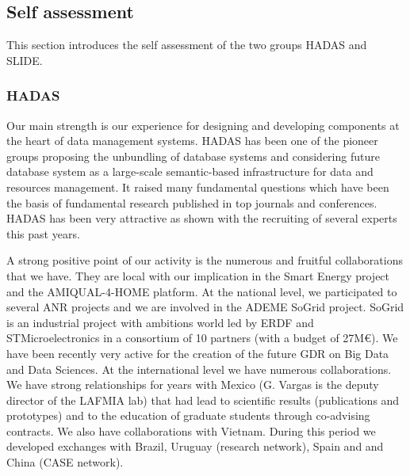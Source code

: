 

\subsection{Self assessment} %
\label{sub:hadas_self_assesment}

This section introduces the self assessment of the two groups HADAS and SLIDE.

\subsubsection*{HADAS}

Our main strength is our experience for designing and developing components at the heart of data management systems. HADAS has been one of the pioneer groups proposing the unbundling of database systems and considering future database system as a large-scale semantic-based infrastructure for data and resources management. It raised many fundamental questions  which have been the basis of fundamental research published in top journals and conferences. HADAS has been very attractive as shown with the recruiting of several experts this past years. 


A strong positive point of our activity is the numerous and fruitful collaborations that we have. They  are local with our  implication in the Smart Energy project and the AMIQUAL-4-HOME platform.  At the national level, we participated to several ANR projects and we are involved in the ADEME SoGrid project. SoGrid is an industrial project with ambitions world led by ERDF and STMicroelectronics in a consortium of 10 partners (with a budget of 27M\euro ). We have been recently very active for the creation of the future GDR on Big Data and Data Sciences. 
At the international level we have numerous  collaborations.  We have strong relationships for years with Mexico (G. Vargas is the deputy director of the LAFMIA lab) that had lead to scientific results (publications and prototypes) and to the education of graduate students through co-advising contracts. We also have collaborations with Vietnam. During this period we developed exchanges with Brazil, Uruguay (research network), Spain and and China (CASE network).  

